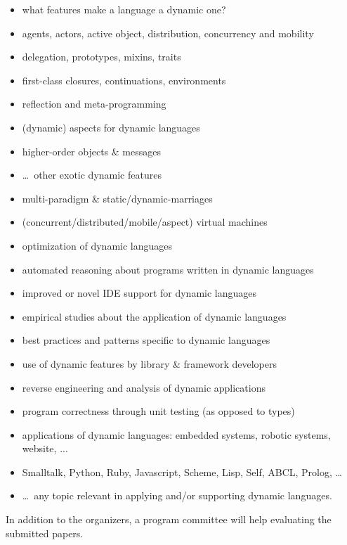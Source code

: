 \documentclass[runningheads]{llncs}
\newcommand\MH[1]{\nb{Michael}{#1}}
\begin{document}
\begin{itemize}
\item what features make a language a dynamic one?
\item agents, actors, active object, distribution, concurrency and mobility
\item delegation, prototypes, mixins, traits
\item first-class closures, continuations, environments
\item reflection and meta-programming
\item (dynamic) aspects for dynamic languages
\item higher-order objects \& messages
\item \dots\ other exotic dynamic features
\item multi-paradigm \& static/dynamic-marriages
\item (concurrent/distributed/mobile/aspect) virtual machines
\item optimization of dynamic languages
\item automated reasoning about programs written in dynamic languages
\item improved or novel IDE support for dynamic languages
\item empirical studies about the application of dynamic languages 
\item best practices and patterns specific to dynamic languages
\item use of dynamic features by library \& framework developers
\item reverse engineering and analysis of dynamic applications
\item program correctness through unit testing (as opposed to types) %
\item applications of dynamic languages: embedded systems, robotic systems, website, ...
\item Smalltalk, Python, Ruby, Javascript, Scheme, Lisp, Self, ABCL, Prolog, \dots
\item \dots\ any topic relevant in applying and/or supporting dynamic languages.
\end{itemize}

In addition to the organizers, a program committee will help evaluating the submitted papers.
\end{document}
